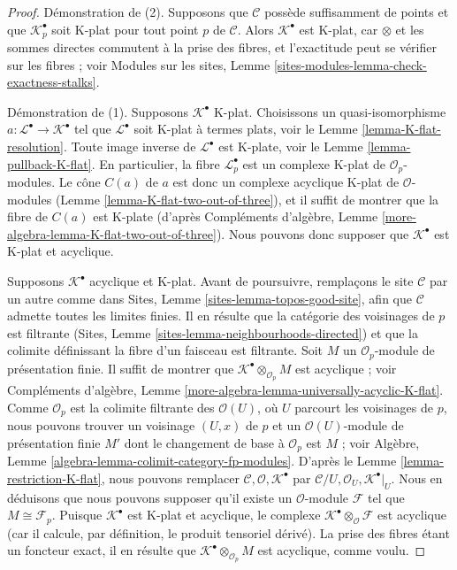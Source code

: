 \begin{proof}
Démonstration de (2). Supposons que $\mathcal{C}$ possède suffisamment de
points et que $\mathcal{K}_p^\bullet$ soit K-plat pour tout point $p$ de
$\mathcal{C}$. Alors $\mathcal{K}^\bullet$ est K-plat, car $\otimes$ et les
sommes directes commutent à la prise des fibres, et l'exactitude peut se
vérifier sur les fibres ; voir Modules sur les sites, Lemme
\ref{sites-modules-lemma-check-exactness-stalks}.

\medskip\noindent
Démonstration de (1). Supposons $\mathcal{K}^\bullet$ K-plat. Choisissons
un quasi-isomorphisme $a : \mathcal{L}^\bullet \to \mathcal{K}^\bullet$ tel
que $\mathcal{L}^\bullet$ soit K-plat à termes plats, voir le Lemme
\ref{lemma-K-flat-resolution}. Toute image inverse de
$\mathcal{L}^\bullet$ est K-plate, voir le Lemme
\ref{lemma-pullback-K-flat}. En particulier, la fibre
$\mathcal{L}_p^\bullet$ est un complexe K-plat de
$\mathcal{O}_p$-modules. Le cône $C(a)$ de $a$ est donc un complexe
acyclique K-plat de $\mathcal{O}$-modules (Lemme
\ref{lemma-K-flat-two-out-of-three}), et il suffit de montrer que la fibre
de $C(a)$ est K-plate (d'après Compléments d'algèbre, Lemme
\ref{more-algebra-lemma-K-flat-two-out-of-three}). Nous pouvons donc
supposer que $\mathcal{K}^\bullet$ est K-plat et acyclique.

\medskip\noindent
Supposons $\mathcal{K}^\bullet$ acyclique et K-plat. Avant de poursuivre,
remplaçons le site $\mathcal{C}$ par un autre comme dans Sites, Lemme
\ref{sites-lemma-topos-good-site}, afin que $\mathcal{C}$ admette toutes
les limites finies. Il en résulte que la catégorie des voisinages de $p$
est filtrante (Sites, Lemme \ref{sites-lemma-neighbourhoods-directed}) et
que la colimite définissant la fibre d'un faisceau est filtrante. Soit $M$
un $\mathcal{O}_p$-module de présentation finie. Il suffit de montrer que
$\mathcal{K}^\bullet \otimes_{\mathcal{O}_p} M$ est acyclique ; voir
Compléments d'algèbre, Lemme
\ref{more-algebra-lemma-universally-acyclic-K-flat}. Comme
$\mathcal{O}_p$ est la colimite filtrante des $\mathcal{O}(U)$, où $U$
parcourt les voisinages de $p$, nous pouvons trouver un voisinage $(U, x)$
de $p$ et un $\mathcal{O}(U)$-module de présentation finie $M'$ dont le
changement de base à $\mathcal{O}_p$ est $M$ ; voir Algèbre, Lemme
\ref{algebra-lemma-colimit-category-fp-modules}. D'après le Lemme
\ref{lemma-restriction-K-flat}, nous pouvons remplacer
$\mathcal{C}, \mathcal{O}, \mathcal{K}^\bullet$ par
$\mathcal{C}/U, \mathcal{O}_U, \mathcal{K}^\bullet|_U$. Nous en déduisons
que nous pouvons supposer qu'il existe un $\mathcal{O}$-module
$\mathcal{F}$ tel que $M \cong \mathcal{F}_p$. Puisque
$\mathcal{K}^\bullet$ est K-plat et acyclique, le complexe
$\mathcal{K}^\bullet \otimes_\mathcal{O} \mathcal{F}$ est acyclique (car
il calcule, par définition, le produit tensoriel dérivé). La prise des
fibres étant un foncteur exact, il en résulte que
$\mathcal{K}^\bullet \otimes_{\mathcal{O}_p} M$ est acyclique, comme voulu.
\end{proof}

